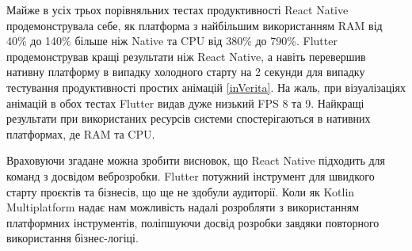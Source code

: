 Майже в усіх трьох порівняльних тестах продуктивності React Native продемонструвала себе, як платформа з найбільшим
використанням RAM від 40\% до 140\% більше ніж Native та CPU від 380\% до 790\%. Flutter продемонстрував кращі результати
ніж React Native, а навіть перевершив нативну платформу в випадку холодного старту на 2 секунди для випадку тестування
продуктивності простих анімацій \ref{inVerita}.
На жаль, при візуалізаціях анімацій в обох тестах Flutter видав дуже низький FPS 8 та 9.
Найкращі результати при використаних ресурсів системи спостерігаються в нативних платформах, де RAM та CPU.

Враховуючи згадане можна зробити висновок, що React Native підходить для команд з досвідом веброзробки.
Flutter потужний інструмент для швидкого старту проєктів та бізнесів, що ще не здобули аудиторії.
Коли як Kotlin Multiplatform надає нам можливість надалі розробляти з використанням платформних інструментів,
поліпшуючи досвід розробки завдяки повторного використання бізнес-логіці.
